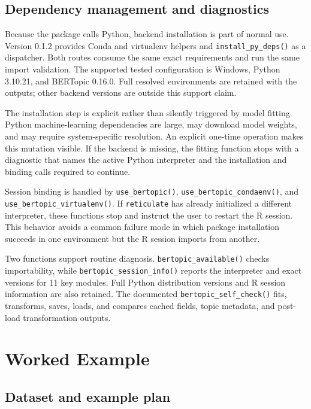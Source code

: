 \documentclass[12pt]{article}
\newcommand{\pkg}[1]{\texttt{#1}}
\newcommand{\code}[1]{\texttt{#1}}
\begin{document}
\subsection{Dependency management and diagnostics}

Because the package calls Python, backend installation is part of normal use. Version 0.1.2 provides Conda and virtualenv helpers and \code{install\_py\_deps()} as a dispatcher. Both routes consume the same exact requirements and run the same import validation. The supported tested configuration is Windows, Python 3.10.21, and BERTopic 0.16.0. Full resolved environments are retained with the outputs; other backend versions are outside this support claim.

The installation step is explicit rather than silently triggered by model fitting. Python machine-learning dependencies are large, may download model weights, and may require system-specific resolution. An explicit one-time operation makes this mutation visible. If the backend is missing, the fitting function stops with a diagnostic that names the active Python interpreter and the installation and binding calls required to continue.

Session binding is handled by \code{use\_bertopic()}, \code{use\_bertopic\_condaenv()}, and \code{use\_bertopic\_virtualenv()}. If \pkg{reticulate} has already initialized a different interpreter, these functions stop and instruct the user to restart the R session. This behavior avoids a common failure mode in which package installation succeeds in one environment but the R session imports from another.

Two functions support routine diagnosis. \code{bertopic\_available()} checks importability, while \code{bertopic\_session\_info()} reports the interpreter and exact versions for 11 key modules. Full Python distribution versions and R session information are also retained. The documented \code{bertopic\_self\_check()} fits, transforms, saves, loads, and compares cached fields, topic metadata, and post-load transformation outputs.

\section{Worked Example}

\subsection{Dataset and example plan}
\end{document}

